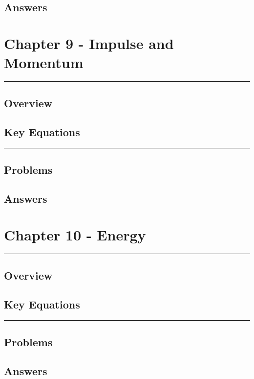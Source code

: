 \documentclass[a4paper,12pt]{article}
\begin{document}
\subsection*{Answers}

\pagebreak
\section*{Chapter 9 - Impulse and Momentum}
\rule{\linewidth}{1pt}
\subsection*{Overview}
\subsection*{Key Equations}

\begin{center}
  \rule{6cm}{0.5pt}
\end{center}
\subsection*{Problems}
\subsection*{Answers}

\pagebreak
\section*{Chapter 10 - Energy}
\rule{\linewidth}{1pt}
\subsection*{Overview}
\subsection*{Key Equations}

\begin{center}
  \rule{6cm}{0.5pt}
\end{center}
\subsection*{Problems}
\subsection*{Answers}
\end{document}
